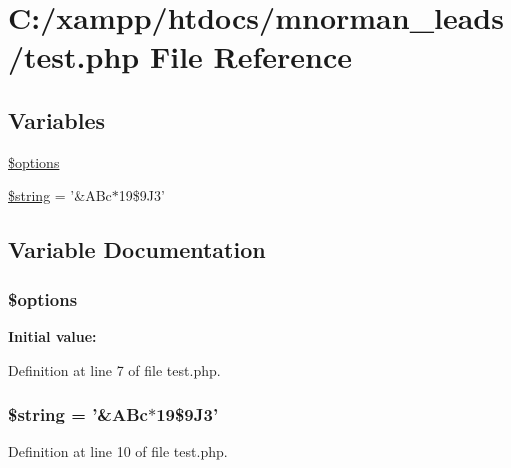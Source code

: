 \hypertarget{test_8php}{\section{C\-:/xampp/htdocs/mnorman\-\_\-leads/test.php File Reference}
\label{test_8php}
}
\subsection*{Variables}
\begin{DoxyCompactItemize}
\item 
\hyperlink{test_8php_a011800c63ece4cbbfa77136a20607023}{\$options}
\item 
\hyperlink{test_8php_a05bc82187ba145848edd864852f4bd37}{\$string} = '\&A\-Bc$\ast$19\$9\-J3'
\end{DoxyCompactItemize}


\subsection{Variable Documentation}
\hypertarget{test_8php_a011800c63ece4cbbfa77136a20607023}{
\subsubsection[{\$options}]{\setlength{\rightskip}{0pt plus 5cm}\$options}}\label{test_8php_a011800c63ece4cbbfa77136a20607023}
{\bfseries Initial value\-:}


Definition at line 7 of file test.\-php.

\hypertarget{test_8php_a05bc82187ba145848edd864852f4bd37}{
\subsubsection[{\$string}]{\setlength{\rightskip}{0pt plus 5cm}\$string = '\&A\-Bc$\ast$19\$9\-J3'}}\label{test_8php_a05bc82187ba145848edd864852f4bd37}


Definition at line 10 of file test.\-php.

